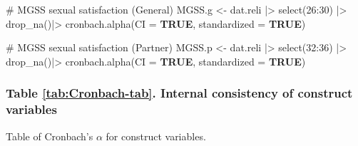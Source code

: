 \documentclass[
  bookmarksnumbered]{article}
\newenvironment{Shaded}{\begin{snugshade}}{\end{snugshade}}
\newcommand{\AttributeTok}[1]{\textcolor[rgb]{0.80,0.80,0.80}{#1}}
\newcommand{\CommentTok}[1]{\textcolor[rgb]{0.50,0.62,0.50}{#1}}
\newcommand{\ConstantTok}[1]{\textcolor[rgb]{0.86,0.64,0.64}{\textbf{#1}}}
\newcommand{\DecValTok}[1]{\textcolor[rgb]{0.86,0.86,0.80}{#1}}
\newcommand{\FunctionTok}[1]{\textcolor[rgb]{0.94,0.94,0.56}{#1}}
\newcommand{\NormalTok}[1]{\textcolor[rgb]{0.80,0.80,0.80}{#1}}
\newcommand{\OtherTok}[1]{\textcolor[rgb]{0.94,0.94,0.56}{#1}}
\newcommand{\SpecialCharTok}[1]{\textcolor[rgb]{0.86,0.64,0.64}{#1}}
\begin{document}
\begin{Shaded}
\begin{Highlighting}[]
\CommentTok{\# MGSS sexual satisfaction (General)}
\NormalTok{MGSS.g }\OtherTok{\textless{}{-}}\NormalTok{ dat.reli }\SpecialCharTok{|\textgreater{}}
  \FunctionTok{select}\NormalTok{(}\DecValTok{26}\SpecialCharTok{:}\DecValTok{30}\NormalTok{) }\SpecialCharTok{|\textgreater{}} 
  \FunctionTok{drop\_na}\NormalTok{()}\SpecialCharTok{|\textgreater{}} 
  \FunctionTok{cronbach.alpha}\NormalTok{(}\AttributeTok{CI =} \ConstantTok{TRUE}\NormalTok{, }\AttributeTok{standardized =} \ConstantTok{TRUE}\NormalTok{)}

\CommentTok{\# MGSS sexual satisfaction (Partner)}
\NormalTok{MGSS.p }\OtherTok{\textless{}{-}}\NormalTok{ dat.reli }\SpecialCharTok{|\textgreater{}}
  \FunctionTok{select}\NormalTok{(}\DecValTok{32}\SpecialCharTok{:}\DecValTok{36}\NormalTok{) }\SpecialCharTok{|\textgreater{}} 
  \FunctionTok{drop\_na}\NormalTok{()}\SpecialCharTok{|\textgreater{}} 
  \FunctionTok{cronbach.alpha}\NormalTok{(}\AttributeTok{CI =} \ConstantTok{TRUE}\NormalTok{, }\AttributeTok{standardized =} \ConstantTok{TRUE}\NormalTok{)}
\end{Highlighting}
\end{Shaded}

\subsubsection{Table \ref{tab:Cronbach-tab}. Internal consistency of construct variables}\label{table-reftabcronbach-tab.-internal-consistency-of-construct-variables}

Table of Cronbach's \(\alpha\) for construct variables.
\end{document}
